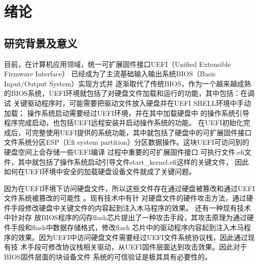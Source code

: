 %
%
\chapter{绪论}
%
%
\section{研究背景及意义}
目前，在计算机应用领域，统一可扩展固件接口UEFI（Unified Extensible Firmware Interface）
已经成为了主流基础输入输出系统BIOS（Basic Input/Output System）实现方式并
逐渐取代了传统BIOS，作为一个越来越成熟的BIOS系统，UEFI环境就包括了对硬盘文件加载和运行的功能，其中包括：在调试
关键驱动程序时，可能需要把驱动文件放入硬盘并在UEFI SHELL环境中手动加载\cite{english16,english20}；
操作系统启动需要经过UEFI环境，并在其中加载硬盘中
的操作系统引导程序完成启动，也包括UEFI远程安装并启动操作系统的功能\cite{chinese29}。
在UEFI初始化完成后，可完整使用UEFI提供的系统功能，其中就包括了硬盘中的可扩展固件接口
文件系统分区ESP（Efi system partition）分区数据操作。这块UEFI可访问到的硬盘空间上会存储一些UEFI编译
过程中重要的可扩展固件接口
可执行文件.efi文件，其中就包括了操作系统启动引导文件start\_kernel.efi这样的关键文件\cite{chinese18}，
因此如何在UEFI环境中安全的加载硬盘设备文件就成了关键问题。
\par 因为在UEFI环境下访问硬盘文件，所以这些文件存在通过硬盘被篡改和通过UEFI文件系统被篡改的可能性
\cite{chinese16}。现有技术中有针
对硬盘文件的硬件攻击方法\cite{english5}，通过硬件手段修改硬盘中关键文件的内容起到注入木马程序的效果。
还有一种现有技术中针对存
放BIOS程序的闪存flash芯片提出了一种攻击手段，其攻击原理为通过硬件手段和flash中数据存储格式，修改flash
芯片中的驱动程序内容起到注入木马程序的效果。因为UEFI中访问硬盘文件需要经过UEFI文件系统协议栈，因此通过现有技
术手段可修改协议栈相关驱动\cite{english3}，从UEFI固件层面达到攻击效果。因此对于BIOS固件层面的块设备文件
系统的可信验证是极其具有必要性的\cite{english17,english6,english7}。

%
%

